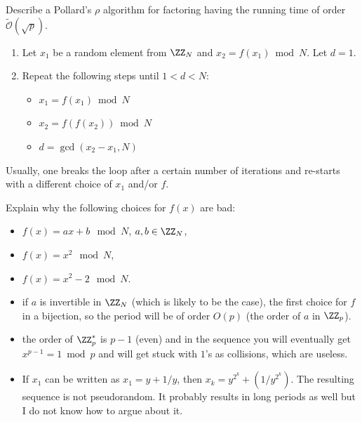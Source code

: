\documentclass[11pt]{exam}
\theoremstyle{definition}
\newcommand{\bigO}{\mathcal{O}}
\begin{document}
{\begin{questions}
\begin{solution}
	\end{solution}
	\question Describe a Pollard's $\rho$ algorithm for factoring having the running time of order $\widetilde{\bigO} (\sqrt{p})$.
	\begin{solution}
		\begin{enumerate}
			\item Let $x_1$ be a random element from $\ZZ_{N}$ and $x_2 = f(x_1) \bmod N$. Let $d = 1$.
			\item Repeat the following steps until $ 1 < d < N $:
			\begin{itemize}
				\item $x_1 = f(x_1) \bmod N$
				\item $x_2 = f(f(x_2)) \bmod N$
				\item $d = \gcd(x_2 - x_1, N)$
			\end{itemize}
		\end{enumerate}
	Usually, one breaks the loop after a certain number of iterations and re-starts with a different choice of $x_1$ and/or $f$.
	\end{solution}
	\question Explain why the following choices for $f(x)$ are bad:
	\begin{itemize}
		\item $f(x) = ax+b \mod N$,  $a, b \in \ZZ_{N}$,
		\item $f(x) = x^2 \mod N$,
		\item $f(x) = x^2 - 2 \mod N$.
	\end{itemize}
	\begin{solution}
		\begin{itemize}
			\item if $a$ is invertible in $\ZZ_{N}$ (which is likely to be the case), the first choice for $f$ in a bijection, so the period will be of order $O(p)$ (the order of $a$ in $\ZZ_p$).
			\item the order of $\ZZ_p^*$ is $p-1$ (even) and in the sequence you will eventually get $x^{p-1} = 1 \bmod p$ and will get stuck with $1$'s as collisions, which are useless.
			\item If $x_1$ can be written as $x_1 = y + 1/y$, then $x_k = y^{2^k}+(1/y^{2^k})$. The resulting sequence is not pseudorandom. It probably results in long periods as well but I do not know how to argue about it.
		\end{itemize}
	
	\end{solution}
\end{questions}

}
\end{document}
